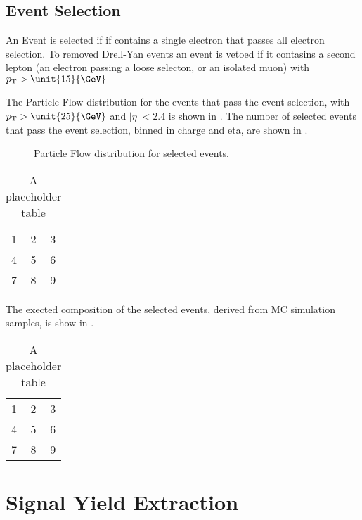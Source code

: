 
\subsection{Event Selection}

An Event is selected if if contains a single electron that passes all electron
selection.
To removed Drell-Yan events an event is vetoed if it contasins a second lepton
(an electron passing a loose selecton, or an isolated muon) with $\pt > 
\unit{15}{\GeV}$

The Particle Flow \ETm distribution for the events that pass the event
selection, with $\pt > \unit{25}{\GeV}$ and $|\eta| < 2.4$ is shown in
.
The number of selected events that pass the event selection, binned in charge 
and eta, are shown in . 

\begin{figure}[htb]
  \centering
  \caption{Particle Flow \ETm distribution for selected events.}
  \label{asym36:pfmet}
\end{figure}

\begin{table}[htb]
  \centering
  \begin{tabular}{| l c r |}
    \hline
    1 & 2 & 3 \\
    4 & 5 & 6 \\
    7 & 8 & 9 \\
  \hline
  \end{tabular}
  \caption{A placeholder table}
  \label{asym36:selectedevents}
\end{table}
                           
The exected composition of the selected events, derived from MC simulation
samples, is show in . 

\begin{table}[htb]
  \centering
  \begin{tabular}{| l c r |}
    \hline
    1 & 2 & 3 \\
    4 & 5 & 6 \\
    7 & 8 & 9 \\
  \hline
  \end{tabular}
  \caption{A placeholder table}
  \label{asym36:selectedcomp}
\end{table}


\section{Signal Yield Extraction}

